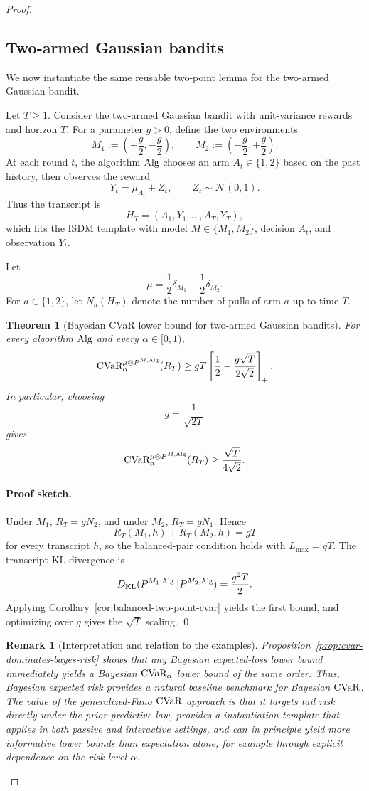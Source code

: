\documentclass[conference]{IEEEtran}
\newtheorem{theorem}{Theorem}
\newtheorem{remark}{Remark}
\begin{document}
\begin{proof}[Proof]
\subsection{Two-armed Gaussian bandits}

We now instantiate the same reusable two-point lemma for the two-armed Gaussian bandit.

Let \(T\ge 1\). Consider the two-armed Gaussian bandit with unit-variance rewards and horizon \(T\). For a parameter \(g>0\), define the two environments
\[
M_1:=\left(+\frac{g}{2},-\frac{g}{2}\right),
\qquad
M_2:=\left(-\frac{g}{2},+\frac{g}{2}\right).
\]
At each round \(t\), the algorithm \(\textup{Alg}\) chooses an arm \(A_t\in\{1,2\}\) based on the past history, then observes the reward
\[
Y_t=\mu_{A_t}+Z_t,
\qquad
Z_t\sim \mathcal{N}(0,1).
\]
Thus the transcript is
\[
H_T=(A_1,Y_1,\dots,A_T,Y_T),
\]
which fits the ISDM template with model \(M\in\{M_1,M_2\}\), decision \(A_t\), and observation \(Y_t\).

Let
\[
\mu=\frac12\delta_{M_1}+\frac12\delta_{M_2}.
\]
For \(a\in\{1,2\}\), let \(N_a(H_T)\) denote the number of pulls of arm \(a\) up to time \(T\).

\begin{theorem}[Bayesian \textup{CVaR} lower bound for two-armed Gaussian bandits]
\label{thm:two-armed-gaussian-cvar-reusable}
For every algorithm \(\textup{Alg}\) and every \(\alpha\in[0,1)\),
\[
\textup{CVaR}_\alpha^{\mu\otimes P^{M,\textup{Alg}}}(R_T)
\ge
gT\left[\frac12-\frac{g\sqrt{T}}{2\sqrt{2}}\right]_+.
\]
In particular, choosing
\[
g=\frac{1}{\sqrt{2T}}
\]
gives
\[
\textup{CVaR}_\alpha^{\mu\otimes P^{M,\textup{Alg}}}(R_T)
\ge
\frac{\sqrt{T}}{4\sqrt{2}}.
\]
\end{theorem}

\paragraph{Proof sketch.}
Under \(M_1\), \(R_T=gN_2\), and under \(M_2\), \(R_T=gN_1\). Hence
\[
R_T(M_1,h)+R_T(M_2,h)=gT
\]
for every transcript \(h\), so the balanced-pair condition holds with \(L_{\max}=gT\). The transcript KL divergence is
\[
D_{\textup{KL}}(P^{M_1,\textup{Alg}}\|P^{M_2,\textup{Alg}})=\frac{g^2T}{2}.
\]
Applying Corollary~\ref{cor:balanced-two-point-cvar} yields the first bound, and optimizing over \(g\) gives the \(\sqrt{T}\) scaling. \qed

\begin{remark}[Interpretation and relation to the examples]
\label{rem:comparison-with-bayes-risk}
Proposition~\ref{prop:cvar-dominates-bayes-risk} shows that any Bayesian expected-loss lower bound immediately yields a Bayesian \(\textup{CVaR}_\alpha\) lower bound of the same order. Thus, Bayesian expected risk provides a natural baseline benchmark for Bayesian \(\textup{CVaR}\). The value of the generalized-Fano \(\textup{CVaR}\) approach is that it targets tail risk directly under the prior-predictive law, provides a  instantiation template that applies in both passive and interactive settings, and can in principle yield more informative lower bounds than expectation alone, for example through explicit dependence on the risk level \(\alpha\).


\end{remark}
\end{proof}
\end{document}

